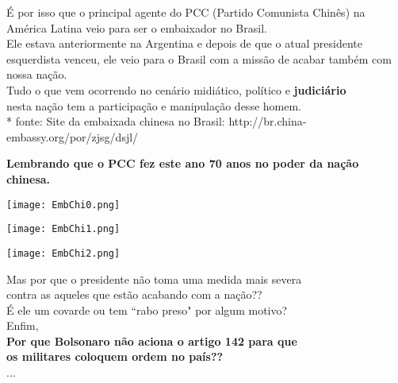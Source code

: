 \documentclass[aspectratio=169]{beamer}
\begin{document}
\begin{frame}
  \centering
  É por isso que o principal agente do PCC (Partido Comunista Chinês) na \\
  América Latina veio para ser o embaixador no Brasil.\\ 
  	\vspace{.5cm}
  Ele estava anteriormente na Argentina e depois de que o atual presidente \\
  esquerdista venceu, ele veio para o Brasil com a missão de acabar também com nossa nação.\\
  	\vspace{.5cm}
	Tudo o que vem ocorrendo no cenário midiático, político e \textbf{judiciário} \\
	nesta nação tem a participação e manipulação desse homem. \\
	\vspace{.5cm}
	\small
	* fonte: Site da embaixada chinesa no Brasil: http://br.china-embassy.org/por/zjsg/dsjl/
	\vspace{.5cm}
	
{\small	\textbf{Lembrando que o PCC fez este ano 70 anos no poder da nação chinesa.}}
\end{frame}

	\begin{frame}
	  \texttt{[image: EmbChi0.png]}
	\end{frame}
	
		\begin{frame}
	  \texttt{[image: EmbChi1.png]}
	\end{frame}
	
		\begin{frame}
	  \texttt{[image: EmbChi2.png]}
	\end{frame}
	


\begin{frame}
\large
  \centering
  Mas por que o presidente não toma uma medida mais severa \\
  contra as aqueles que estão acabando com a nação??\\
  	\vspace{.5cm}
  É ele um covarde ou tem ``rabo preso" por algum motivo?\\
  	\vspace{.5cm}
  Enfim, \\
  \textbf{Por que Bolsonaro não aciona o artigo 142 para que \\
  os militares coloquem ordem no país??}\\
  ...
\end{frame}
\end{document}

